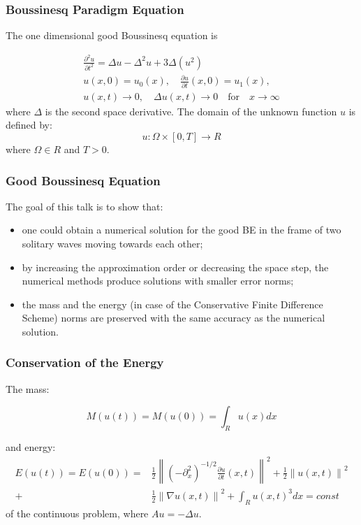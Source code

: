 \documentclass{beamer}
\newcommand{\be}{\begin{equation}}
\newcommand{\ee}{\end{equation}}
\newcommand{\rf}[1]{(\ref{#1})}
\begin{document}
\begin{frame}
\frametitle{Boussinesq Paradigm Equation}


The one dimensional good Boussinesq equation is

\begin{align}\label{problem}
 \frac{\partial^2 u}{\partial t^2}= \Delta u -  \Delta^2 u +  3 \Delta (u^2)
\\
u(x,0) = u_0(x), \quad \frac{\partial u}{\partial t}(x,0)=u_1(x), \nonumber
\\
u(x,t) \rightarrow 0, \quad \Delta u(x, t) \rightarrow 0 \quad \text{for} \quad x \rightarrow \infty \nonumber
\end{align}
where $\Delta$ is the second space derivative. The domain of the unknown function $u$ is defined by:
\be
 u:\Omega \times [0, T] \rightarrow R
\ee
where $\Omega \in R$ and $T>0$.
\end{frame}



\begin{frame}
\frametitle{Good Boussinesq Equation}
The goal of this talk is to show that:
\begin{itemize}
 \item one could obtain a numerical solution for the good BE in the frame of two solitary waves moving towards each other;
 \item by increasing the approximation order or decreasing the space step, the numerical methods produce  solutions with smaller error norms;
 \item the mass and the energy (in case of the Conservative Finite Difference Scheme) norms are preserved with the same accuracy as the numerical solution.
\end{itemize}

\end{frame}


\begin{frame}
\frametitle{Conservation of the Energy}
The mass:

\begin{equation}\label{int}
M(u(t))=M(u(0))=\int_{R} u(x)dx 
\end{equation}

and energy:
\begin{align}\label{ex-en}
E(u(t)) = E(u(0)) =&\frac{1}{2} \left\|(-\partial^2_x)^{-1/2} \frac{\partial u}{\partial t}(x,t)\right\|^2 + \frac{1}{2}  \left\|u (x,t)\right\|^2 
 \nonumber\\
+& \frac{1}{2}\left\| \nabla u(x,t) \right\|^2+ \int _{R} u(x,t)^3  dx = const
\end{align}
of the continuous problem, where $Au=-\Delta u$.
\end{frame}
\end{document}
